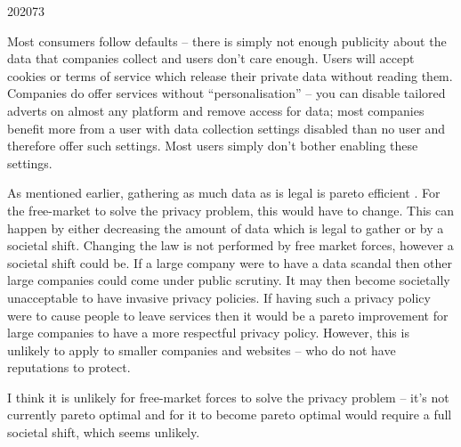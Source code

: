 \documentclass[a4paper]{article}
\begin{document}
\begin{examquestion}{2020}{7}{3}
\begin{enumerate}[label=(\alph*)]
Most consumers follow defaults -- there is simply not enough publicity about
the data that companies collect and users don't care enough. Users
will accept cookies or terms of service which release their private
data without reading them. Companies do offer services without
``personalisation'' -- you can disable tailored adverts on almost any
platform and remove access for data; most companies benefit more from a
user with data collection settings disabled than no user and therefore offer
such settings. Most users simply don't bother enabling these settings.

As mentioned earlier, gathering as much data as is legal is pareto efficient
. For the free-market to solve the privacy problem, this would have to
change. This can happen by either decreasing the amount of data which is
legal to gather or by a societal shift. Changing the law is not performed by
free market forces, however a societal shift could be. If a large company
were to have a data scandal then other large companies could come under
public scrutiny. It may then become societally unacceptable to have invasive
privacy policies. If having such a privacy policy were to cause people to
leave services then it would be a pareto improvement for large companies to
have a more respectful privacy policy. However, this is unlikely to apply to
smaller companies and websites -- who do not have reputations to protect.

I think it is unlikely for free-market forces to solve the privacy
problem -- it's not currently pareto optimal and for it to become pareto
optimal would require a full societal shift, which seems unlikely.

\end{enumerate}

\end{examquestion}
\end{document}
